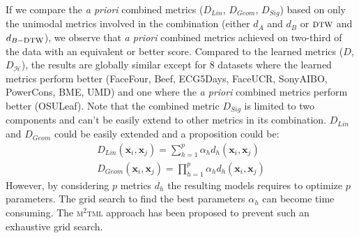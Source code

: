 \noindent If we compare the \textit{a priori} combined metrics ($D_{Lin}$, $D_{Geom}$, $D_{Sig}$) based on only the unimodal metrics involved in the combination (either $d_A$ and $d_B$ or $\mbox{\sc dtw}$ and $d_{B-\mbox{\sc dtw}}$), we observe that \textit{a priori} combined metrics achieved on two-third of the data with an equivalent or better score. Compared to the learned metrics ($D$, $D_{\mathcal{H}}$), the results are globally similar except for 8 datasets where the learned metrics perform better (FaceFour, Beef, ECG5Days, FaceUCR, SonyAIBO, PowerCons, BME, UMD) and one where the \textit{a priori} combined metrics perform better (OSULeaf). Note that the combined metric $D_{Sig}$ is limited to two components and can't be easily extend to other metrics in its combination. $D_{Lin}$ and $D_{Geom}$ could be easily extended and a proposition could be:
\begin{align}
	D_{Lin}(\textbf{x}_i,\textbf{x}_j) = \sum\limits_{h=1}^{p} \alpha_h d_h(\textbf{x}_i,\textbf{x}_j) \\
	D_{Geom}(\textbf{x}_i,\textbf{x}_j) = \prod\limits_{h=1}^{p} \alpha_h d_h(\textbf{x}_i,\textbf{x}_j)
\end{align}
However, by considering $p$ metrics $d_h$ the resulting models requires to optimize $p$ parameters. The grid search to find the best parameters $\alpha_h$ can become time consuming. The \textsc{m$^2$tml} approach has been proposed to prevent such an exhaustive grid search. \\

